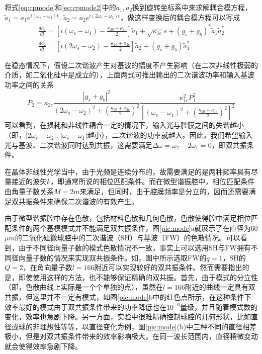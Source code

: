 将式\ref{eq:cpmode}和\ref{eq:cpmode2}中的$a_1, a_2$换到旋转坐标系中来求解耦合模方程，$\tilde{a}_1 = a_1e^{i(\omega_s-\omega_1)t}$, $\tilde{a}_2 = a_2e^{i(2\omega_s-\omega_2)t}$，做这样变换后的耦合模方程可以写成
\begin{gather}
\label{eq:cpmoder}
\frac{d\tilde{a}_1}{dt} = [i(\omega_s-\omega_1)-\frac{\kappa_{20}+\kappa_{1e}}{2}]\tilde{a}_1+\sqrt{\kappa_{1e}}s+(g_s+g_b)^*\tilde{a}_1\tilde{a}_2^* \\
\frac{d\tilde{a}_2}{dt} = [i(2\omega_s-\omega_2)-\frac{\kappa_{20}+\kappa_{2e}}{2}]\tilde{a}_2+(g_s+g_b)\tilde{a}_1^2
\label{eq:cpmoder2}
\end{gather}

在稳态情况下，假设二次谐波产生对基波的幅度不产生影响（在二次非线性极弱的介质，如二氧化硅中是成立的），上面两式可推出输出的二次谐波功率和输入基波功率之间的关系
\begin{equation}
P_2 = \kappa_{2e}\frac{|g_s+g_b|^2}{(2\omega_s-\omega_2)^2+(\frac{\kappa_{20}+\kappa_{2e}}{2})^2}\frac{\kappa_{1e}^2P_1^2}{[(\omega_s-\omega_1)^2+(\frac{\kappa_{10}+\kappa_{1e}}{2})^2]^2}
\end{equation}
可以看到，在损耗和非线性耦合一定的情况下，输入光与腔膜之间的失谐越小（即，$|2\omega_s-\omega_2|$, $|\omega_s-\omega_1|$越小），二次谐波的功率就越大。因此，我们希望输入光与基波、二次谐波同时达到共振，这需要满足$\Delta \omega = \omega_2 - 2\omega_1=0$，即双共振条件。

在晶体非线性光学当中，由于光频是连续分布的，故需要满足的是两种频率具有尽量接近的波矢$k$，即通常所说的相位匹配条件。而在微型谐振腔中，相位匹配条件由角量子数关系$M=2m$来满足，但同时，由于腔膜频率是分立的，因而还需要满足双共振条件来确保二次谐波的有效产生。

由于微型谐振腔中存在色散，包括材料色散和几何色散，色散使得腔中满足相位匹配条件的两个基模模式并不能满足双共振条件，图\ref{pic:mode}a就展示了在直径为60$\mu m$的二氧化硅微球腔中的二次谐波（SH）与基波（FW）的色散情况。可以看到，由于不同径向量子数的模式色散情况不一致，事实上可以选用SH与FW拥有不同径向量子数的情况来实现双共振条件。如，图中所示选取FW的$q=1$，SH的$Q=2$，在角向量子数$l=166$附近可以实现较好的双共振条件。然而需要指出的是，即使使用这样的方法，也不能够保证精确的双共振。首先，由于模式的分立性（即，色散曲线上实际是一个个单独的点），虽然在$l=166$附近的曲线一定具有双共振，但这里并不一定有模式，如图\ref{pic:mode}b中的红色点所示，在这种条件下效率最好的模式由于双共振条件带来的功率降低也在$10^{-6}$量级，并且随着模式数的变化，效率也急剧下降。另一方面，实验中很难精确控制球腔的几何形状，比如直径或球的非理想性等等，以直径变化为例，图\ref{pic:mode}(b)中三种不同的直径相差极小，但是对双共振条件带来的效率影响极大，在同一波长范围内，直径稍微变动就会使得效率急剧下降。

